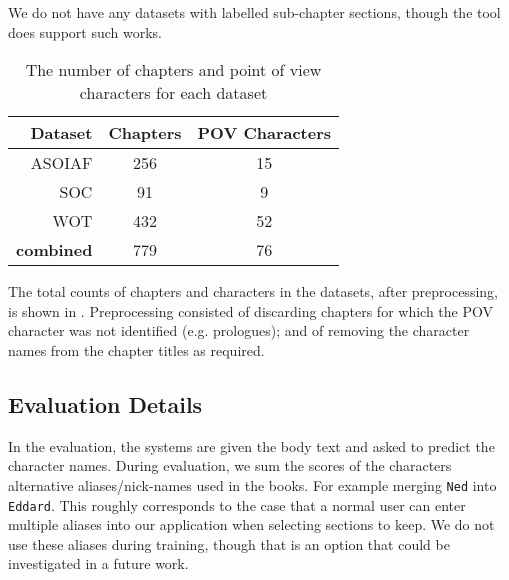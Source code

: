\documentclass[11pt,a4paper]{article}
\newcommand{\parencite}{\citep}
\begin{document}

We do not have any datasets with labelled sub-chapter sections, though the tool does support such works.


\begin{table}
	\begin{tabular}{rcc}
		Dataset & Chapters & POV Characters\\
		\toprule
		ASOIAF  & 256	&	15\\
		SOC		& 91	&	9\\
		WOT     & 432   &   52\\
		\midrule
		\textbf{combined}  &  779 & 76
	\end{tabular}
	\caption{The number of chapters and point of view characters for each dataset \label{tbl:datasets}}
\end{table}

The total counts of chapters and characters in the datasets, after preprocessing, is shown in .
Preprocessing consisted of  discarding chapters for which the POV character was not identified (e.g. prologues); and of removing the character names from the chapter titles as required.

\subsection{Evaluation Details}
In the evaluation, the systems are given the body text and asked to predict the character names.
During evaluation, we sum the scores of the characters alternative aliases/nick-names used in the  books.
For example merging \texttt{Ned} into \texttt{Eddard}.
This roughly corresponds to the case that a normal user can enter multiple aliases into our application when selecting sections to keep.
We do not use these aliases during training, though that is an option that could be investigated in a future work.


%
\end{document}

